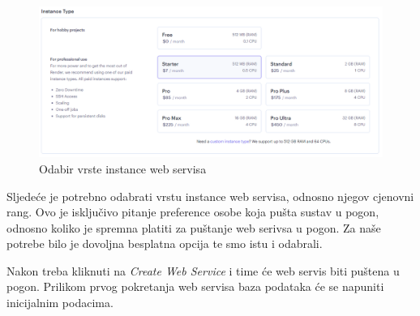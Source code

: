 			\begin{figure}[H]
				\includegraphics[width=\textwidth]{slike/upute/webServisPlacanje.png} %
				\caption{Odabir vrste instance web servisa}
				\label{fig:webServisPlacanje} %
			\end{figure}
			
			Sljedeće je potrebno odabrati vrstu instance web servisa, odnosno njegov cjenovni rang. Ovo je isključivo pitanje preference osobe koja pušta sustav u pogon, odnosno koliko je spremna platiti za puštanje web serivsa u pogon. Za naše potrebe bilo je dovoljna besplatna opcija te smo istu i odabrali.
			
			Nakon treba kliknuti na \textit{Create Web Service} i time će web servis biti puštena u pogon. Prilikom prvog pokretanja web servisa baza podataka će se napuniti inicijalnim podacima.
			
			\eject 